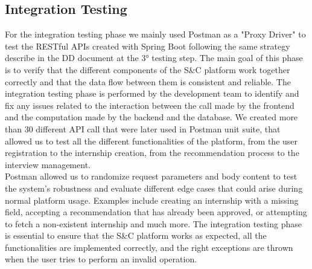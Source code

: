 \subsection{Integration Testing}
For the integration testing phase we mainly used Postman as a "Proxy Driver" to test the RESTful APIs created with Spring Boot following the same strategy describe in the DD document at the 3° testing step. The main goal of this phase is to verify that the different components of the S\&C platform work together correctly and that the data flow between them is consistent and reliable. The integration testing phase is performed by the development team to identify and fix any issues related to the interaction between the call made by the frontend and the computation made by the backend and the database. We created more than 30 different API call that were later used in Postman unit suite, that allowed us to test all the different functionalities of the platform, from the user registration to the internship creation, from the recommendation process to the interview management.\\
Postman allowed us to randomize request parameters and body content to test the system's robustness and evaluate different edge cases that could arise during normal platform usage. Examples include creating an internship with a missing field, accepting a recommendation that has already been approved, or attempting to fetch a non-existent internship and much more. The integration testing phase is essential to ensure that the S\&C platform works as expected, all the functionalities are implemented correctly, and the right exceptions are thrown when the user tries to perform an invalid operation.
